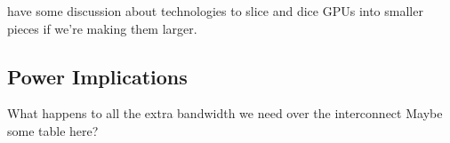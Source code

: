 have some discussion about technologies to slice and dice GPUs into smaller pieces if we're making them larger.


\subsection {Power Implications}

What happens to all the extra bandwidth we need over the interconnect
Maybe some table here?

% 
% 
% 
